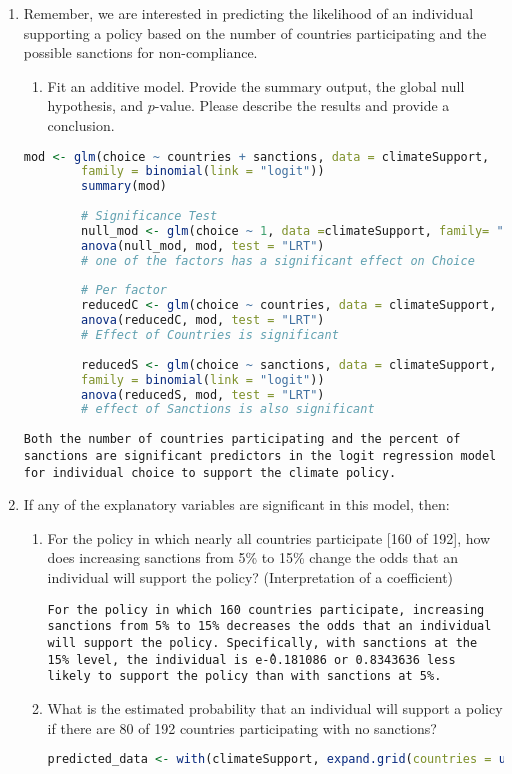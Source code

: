 \documentclass[12pt,letterpaper]{article}
\begin{document}
\begin{enumerate}
	\item
	Remember, we are interested in predicting the likelihood of an individual supporting a policy based on the number of countries participating and the possible sanctions for non-compliance.
	\begin{enumerate}
		\item [] Fit an additive model. Provide the summary output, the global null hypothesis, and $p$-value. Please describe the results and provide a conclusion.
	\end{enumerate}
	\begin{lstlisting}[language=R]
		mod <- glm(choice ~ countries + sanctions, data = climateSupport,
		family = binomial(link = "logit"))
		summary(mod)
		
		# Significance Test
		null_mod <- glm(choice ~ 1, data =climateSupport, family= "binomial")
		anova(null_mod, mod, test = "LRT")
		# one of the factors has a significant effect on Choice
		
		# Per factor
		reducedC <- glm(choice ~ countries, data = climateSupport, family = binomial(link = "logit"))
		anova(reducedC, mod, test = "LRT")
		# Effect of Countries is significant
		
		reducedS <- glm(choice ~ sanctions, data = climateSupport,
		family = binomial(link = "logit"))
		anova(reducedS, mod, test = "LRT")
		# effect of Sanctions is also significant\end{lstlisting}
	\texttt{Both the number of countries participating and the percent of sanctions are significant predictors in the logit regression model for individual choice to support the climate policy.}
	
	\item
	If any of the explanatory variables are significant in this model, then:
	\begin{enumerate}
		\item
		For the policy in which nearly all countries participate [160 of 192], how does increasing sanctions from 5\% to 15\% change the odds that an individual will support the policy? (Interpretation of a coefficient)
		\vspace{.25cm}
		
	\texttt{For the policy in which 160 countries participate, increasing sanctions from 5\% to 15\% decreases the odds that an individual will support the policy. Specifically, with sanctions at the 15\% level, the individual is e\^-0.181086 or 0.8343636 less likely to support the policy than with sanctions at 5\%.}
		\item
		What is the estimated probability that an individual will support a policy if there are 80 of 192 countries participating with no sanctions? 
		\newpage
		\begin{lstlisting}[language=R]
			predicted_data <- with(climateSupport, expand.grid(countries = unique(countries), sanctions = unique(sanctions)))
			

\end{lstlisting}
\end{enumerate}
\end{enumerate}
\end{document}
